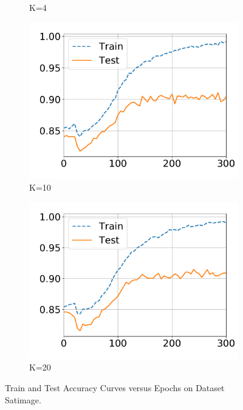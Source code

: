 \begin{figure}[!t]
\begin{subfigure}{0.31\textwidth}
    \caption{K=4}
  \end{subfigure}
  \centering
  \begin{subfigure}{.31\textwidth}
    \centering
    \includegraphics[width=1\linewidth]{images/supply/train_curves/satimage_10.pdf}
    \vspace{-0.8cm}
    \caption{K=10}
  \end{subfigure}
  \centering
  \begin{subfigure}{.31\textwidth}
    \centering
    \includegraphics[width=1\linewidth]{images/supply/train_curves/satimage_20.pdf}
    \vspace{-0.8cm}
    \caption{K=20}
  \end{subfigure}
  \caption{Train and Test Accuracy Curves versus Epochs on Dataset Satimage.}
  \label{fig:class-satimage}
\end{figure}

